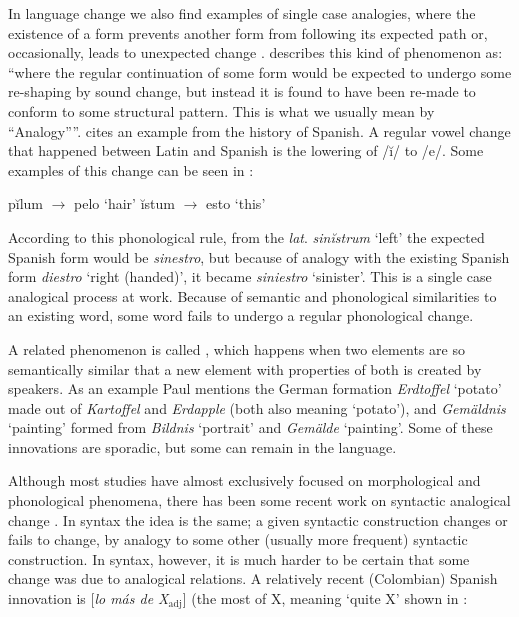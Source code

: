 In language change we also find examples of single case analogies, where the existence of a form prevents another form from following its expected path or, occasionally, leads to unexpected change \autocite{Bauer.2003}. \textcite[276]{Anderson.2015} describes this kind of phenomenon as: ``where the regular continuation of some form would be expected to undergo some re-shaping by sound change, but instead it is found to have been re-made to conform to some structural pattern. This is what we usually mean by ``Analogy''''. \textcite{Rainer.2013} cites an example from the history of Spanish. A regular vowel change that happened between Latin and Spanish is the lowering of /ĭ/ to /e/. Some examples of this change can be seen in :


\begin{exe}
    \ex \label{exe-change-lat}
    \begin{xlist}
        \ex pĭlum $\rightarrow$ pelo `hair'
        \ex ĭstum $\rightarrow$ esto `this'
    \end{xlist}
\end{exe}

According to this phonological rule, from the \textit{lat}. \textit{sin\emph{ĭ}strum} `left' the expected Spanish form would be \textit{sin\emph{e}stro}, but because of analogy with the existing Spanish form \textit{diestro} `right (handed)', it became \textit{sin\emph{ie}stro} `sinister'. This is a single case analogical process at work. Because of semantic and phonological similarities to an existing word, some word fails to undergo a regular phonological change.

A  related phenomenon is called  \autocite[160]{Paul.1995}, which happens when two elements are so semantically similar that a new element with properties of both is created by speakers. As an example Paul mentions the German formation \textit{Erdtoffel} `potato' made out of \textit{Kartoffel} and \textit{Erdapple} (both also meaning `potato'), and \textit{Gemäldnis} `painting' formed from \textit{Bildnis} `portrait' and \textit{Gemälde} `painting'. Some of these innovations are sporadic, but some can remain in the language.

Although most studies have almost exclusively focused on morphological and phonological phenomena, there has been some recent work on syntactic analogical change \autocite{DeSmet.2016}. In syntax the idea is the same; a given syntactic construction changes or fails to change, by analogy to some other (usually more frequent) syntactic construction. In syntax, however, it is much harder to be certain that some change was due to analogical relations. A relatively recent (Colombian) Spanish innovation is [\textit{lo más de X$_{\text{adj}}$}] (the most of X, meaning `quite X' shown in :

